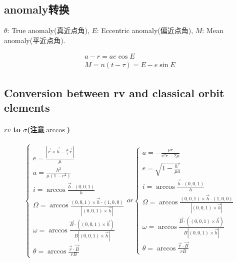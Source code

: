 \documentclass[UTF8]{ctexart}
\begin{document}
\subsection{anomaly转换}

$\theta$: True anomaly(真近点角), $E$: Eccentric anomaly(偏近点角), $M$: Mean anomaly(平近点角).

\begin{gather}
	a-r=ae\cos E\\
	M=n(t-\tau)=E-e\sin E
\end{gather}

\subsection{Conversion between rv and classical orbit elements}
\paragraph{$rv$ to $\sigma$(注意$\arccos$)}
\begin{equation}
	\begin{cases}
		e=\frac{|\dot{\vec{r}}\times\vec{h}-\frac{\mu}{r}\vec{r}|}{\mu}\\
		a=\frac{h^2}{\mu(1-e^2)}\\
		i=\arccos{\frac{\vec{h}\cdot(0,0,1)}{h}}\\
		\Omega=\arccos\frac{(0,0,1)\times\vec{h}\cdot(1,0,0)}{|(0,0,1)\times\vec{h}|}\\
		\omega=\arccos\frac{\vec{B}\cdot((0,0,1)\times\vec{h})}{B|(0,0,1)\times\vec{h}|}\\
		\theta=\arccos\frac{\vec{r}\cdot\vec{B}}{rB}
	\end{cases}or
\begin{cases}
	a=-\frac{\mu r}{v^2r-2\mu}\\
	e=\sqrt{1-\frac{h^2}{\mu a}}\\
	i=\arccos{\frac{\vec{h}\cdot(0,0,1)}{h}}\\
	\Omega=\arccos\frac{(0,0,1)\times\vec{h}\cdot(1,0,0)}{|(0,0,1)\times\vec{h}|}\\
	\omega=\arccos\frac{\vec{B}\cdot((0,0,1)\times\vec{h})}{B|(0,0,1)\times\vec{h}|}\\
	\theta=\arccos\frac{\vec{r}\cdot\vec{B}}{rB}
\end{cases}
\end{equation}
\end{document}

